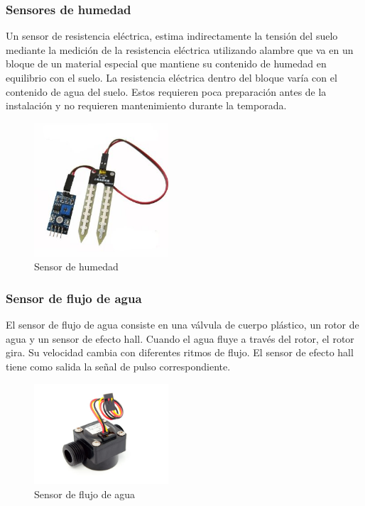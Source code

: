 \documentclass[11pt,letterpaper]{article}
\begin{document}
\subsubsection{Sensores de humedad}

Un sensor de resistencia eléctrica\citep{sensor}, estima indirectamente la tensión del suelo mediante la medición de la resistencia eléctrica utilizando alambre que va en un bloque de un material especial que mantiene su contenido de humedad en equilibrio con el suelo. La resistencia eléctrica dentro del bloque varía con el contenido de agua del suelo. 
Estos requieren poca preparación antes de la instalación y no requieren mantenimiento durante la temporada.

\begin{figure}[ht!]
\caption{Sensor de humedad}
\centering
\includegraphics[width=5cm]{sensorHumedad}
\end{figure}

\newpage

\subsubsection{Sensor de flujo de agua}

El sensor de flujo de agua consiste en una válvula de cuerpo plástico, un rotor de agua y un sensor de efecto hall. Cuando el agua fluye a través del rotor, el rotor gira. Su velocidad cambia con diferentes ritmos de flujo. El sensor de efecto hall tiene como salida la señal de pulso correspondiente.

\begin{figure}[ht!]
\caption{Sensor de flujo de agua}
\centering
\includegraphics[width=5cm]{sensorFlujo}
\end{figure}
\end{document}
